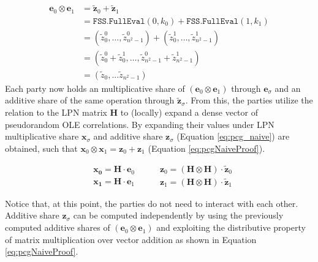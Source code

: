 \begin{equation}
\begin{aligned}
\label{eq:pcgPrimalLPNFssSecretSharing}
\mathbf{e}_0 \otimes \mathbf{e}_1 &= \mathbf{\tilde{z}}_0 + \mathbf{\tilde{z}}_1 \\
&= \texttt{FSS.FullEval}(0, k_0) + \texttt{FSS.FullEval}(1, k_1) \\
&= (\tilde{z}_{0}^0, \ldots, \tilde{z}_{n^2-1}^0) + (\tilde{z}_{0}^1, \ldots, \tilde{z}_{n^2-1}^1) \\
&= (\tilde{z}_{0}^0+\tilde{z}_{0}^1, \ldots, \tilde{z}_{n^2-1}^0+\tilde{z}_{n^2-1}^1) \\
&= (\tilde{z}_0, ... \tilde{z}_{n^2-1})
\end{aligned}
\end{equation}
Each party now holds an multiplicative share of $(\mathbf{e}_0 \otimes \mathbf{e}_1)$ through $\mathbf{e}_\sigma$ and an additive share of the same operation through $\mathbf{\tilde{z}}_\sigma$. From this, the parties utilize the relation to the LPN matrix $\mathbf{H}$ to (locally) expand a dense vector of pseudorandom OLE correlations. By expanding their values under LPN multiplicative share  $\mathbf{x}_\sigma$ and additive share $\mathbf{z}_\sigma$ (Equation \ref{eq:pcg_naive}) are obtained, such that  $\mathbf{x}_0 \otimes\mathbf{x}_1 = \mathbf{z}_0 + \mathbf{z}_1 $ (Equation \ref{eq:pcgNaiveProof}). 

\begin{equation}
\begin{aligned}
& \mathbf{x_0} = \mathbf{H}\cdot \mathbf{e}_0 \\
& \mathbf{x_1} = \mathbf{H}\cdot \mathbf{e}_1
\end{aligned}
\:\:\:\:\:\: 
\begin{aligned}
&\mathbf{z}_0 = (\mathbf{H}\otimes \mathbf{H}) \cdot \mathbf{\tilde{z}}_0 \\
& \mathbf{z}_1 = (\mathbf{H}\otimes \mathbf{H}) \cdot \mathbf{\tilde{z}}_1
\end{aligned}
\label{eq:pcg_naive}
\end{equation}

Notice that, at this point, the parties do not need to interact with each other. Additive share $\mathbf{z}_\sigma$ can be computed independently by using the previously computed additive shares of  $(\mathbf{e}_0 \otimes \mathbf{e}_1)$ and exploiting the distributive property of matrix multiplication over vector addition as shown in Equation \ref{eq:pcgNaiveProof}.

